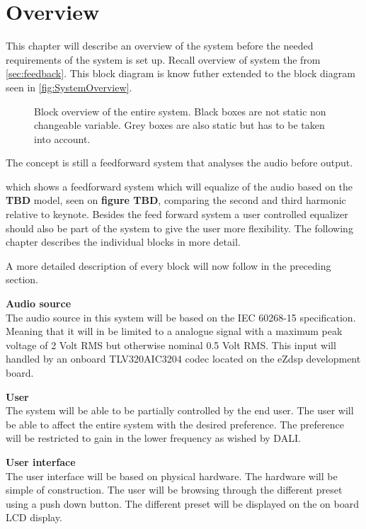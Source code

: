 \chapter{Overview} \label{ch:overview}
This chapter will describe an overview of the system before the needed requirements of the system is set up. Recall overview of system the from \ref{sec:feedback}. This block diagram is know futher extended to the block diagram seen in \autoref{fig:SystemOverview}.

\begin{figure}[H]
\centering
{}
\scalebox{0.8}{
}
\caption{Block overview of the entire system. Black boxes are not static non changeable variable. Grey boxes are also static but has to be taken into account.}
\label{fig:SystemOverview}
\end{figure}

The concept is still a feedforward system that analyses the audio before output.

 which shows a feedforward system which will equalize of the audio based on the \textbf{TBD} model, seen on \textbf{figure TBD}, comparing the second and third harmonic relative to keynote. Besides the feed forward system a user controlled equalizer should also be part of the system to give the user more flexibility. The following chapter describes the individual blocks in more detail.          


A more detailed description of every block will now follow in the preceding section.

\textbf{Audio source} \\
The audio source in this system will be based on the IEC 60268-15 specification. Meaning that it will in be limited to a analogue signal with a maximum peak voltage of 2 Volt RMS but otherwise nominal 0.5 Volt RMS. This input will handled by an onboard TLV320AIC3204 codec located on the eZdsp development board.

\textbf{User} \\
The system will be able to be partially controlled by the end user. The user will be able to affect the entire system with the desired preference. The preference will be restricted to gain in the lower frequency as wished by DALI.

\textbf{User interface}\\
The user interface will be based on physical hardware. The hardware will be simple of construction. The user will be browsing through the different preset using a push down button. The different preset will be displayed on the on board LCD display.

